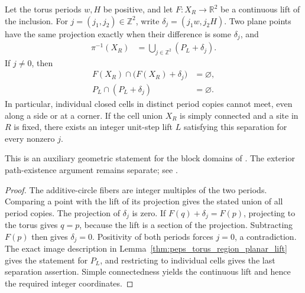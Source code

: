 \begin{lemma}%
    \label{thm:peps_torus_region_period_separation}
    \leanok
    Let the torus periods $w,H$ be positive, and let
    $F:X_R\to\mathbb R^2$ be a continuous lift of the inclusion.
    For $j=(j_1,j_2)\in\mathbb Z^2$, write
    $\delta_j=(j_1w,j_2H)$. Two plane points have the same projection
    exactly when their difference is some $\delta_j$, and
    \begin{align}
        \pi^{-1}(X_R) & =\bigcup_{j\in\mathbb Z^2}(P_L+\delta_j).
    \end{align}
    If $j\ne0$, then
    \begin{align}
        F(X_R)\cap\bigl(F(X_R)+\delta_j\bigr) & =\varnothing, \\
        P_L\cap(P_L+\delta_j)                 & =\varnothing.
    \end{align}
    In particular, individual closed cells in distinct period copies
    cannot meet, even along a side or at a corner. If the cell
    union $X_R$ is simply connected and a site in $R$ is fixed, there
    exists an integer unit-step lift $L$ satisfying this separation
    for every nonzero $j$.

    This is an auxiliary geometric statement for the block domains of
    \cite[\S6.3]{Schuch2010PEPS}. The exterior path-existence argument
    remains separate; see \cite{gap:rmp_peps_quantum_double_g_isometry}.
\end{lemma}
\begin{proof}\leanok
    The additive-circle fibers are integer multiples of the two periods.
    Comparing a point with the lift of its projection gives the stated
    union of all period copies. The projection of $\delta_j$ is zero. If
    $F(q)+\delta_j=F(p)$, projecting to the torus gives $q=p$,
    because the lift is a section of the projection. Subtracting
    $F(p)$ then gives $\delta_j=0$. Positivity of both periods
    forces $j=0$, a contradiction. The exact image description in
    Lemma~\ref{thm:peps_torus_region_planar_lift} gives the statement
    for $P_L$, and restricting to individual cells gives the last
    separation assertion. Simple connectedness yields the continuous
    lift and hence the required integer coordinates.
\end{proof}

